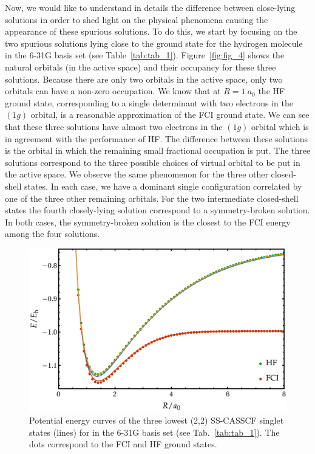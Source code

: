 \documentclass[aps,prb,reprint,showkeys,superscriptaddress]{revtex4-1}
\begin{document}
Now, we would like to understand in details the difference between close-lying solutions in order to shed light on the physical phenomena causing the appearance of these spurious solutions.
To do this, we start by focusing on the two spurious solutions lying close to the ground state for the hydrogen molecule in the 6-31G basis set (see Table~\ref{tab:tab_1}).
Figure~\ref{fig:fig_4} shows the natural orbitals (in the active space) and their occupancy for these three solutions.
Because there are only two orbitals in the active space, only two orbitals can have a non-zero occupation.
We know that at $R=1~a_0$ the HF ground state, corresponding to a single determinant with two electrons in the $(1g)$ orbital, is a reasonable approximation of the FCI ground state.
We can see that these three solutions have almost two electrons in the $(1g)$ orbital which is in agreement with the performance of HF.
The difference between these solutions is the orbital in which the remaining small fractional occupation is put.
The three solutions correspond to the three possible choices of virtual orbital to be put in the active space.
We observe the same phenomenon for the three other closed-shell states.
In each case, we have a dominant single configuration correlated by one of the three other remaining orbitals.
For the two intermediate closed-shell states the fourth closely-lying solution correspond to a symmetry-broken solution.
In both cases, the symmetry-broken solution is the closest to the FCI energy among the four solutions.

\begin{figure}
  \centering
  \includegraphics[width=0.9\linewidth]{Figures/fig_5.pdf}
  \caption{Potential energy curves of the three lowest (2,2) SS-CASSCF singlet states (lines) for  in the 6-31G basis set (see Tab.~\ref{tab:tab_1}). The dots correspond to the FCI and HF ground states. \label{fig:fig_5}}
\end{figure}
\end{document}
